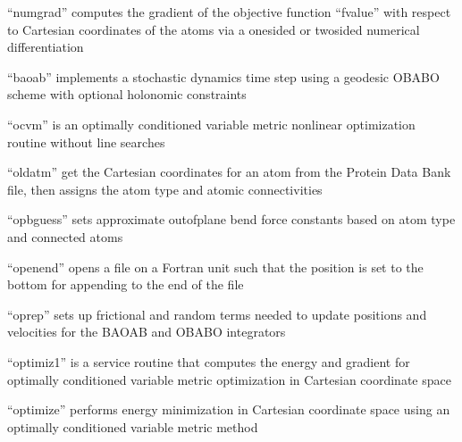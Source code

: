 \documentclass[letterpaper,11pt,english]{sphinxmanual}
\begin{document}
\sphinxAtStartPar
{}

\sphinxAtStartPar
“numgrad” computes the gradient of the objective function “fvalue” with respect to Cartesian coordinates of the atoms via a one\sphinxhyphen{}sided or two\sphinxhyphen{}sided numerical differentiation

\sphinxAtStartPar
{}

\sphinxAtStartPar
“baoab” implements a stochastic dynamics time step using a geodesic OBABO scheme with optional holonomic constraints

\sphinxAtStartPar
{}

\sphinxAtStartPar
“ocvm” is an optimally conditioned variable metric nonlinear optimization routine without line searches

\sphinxAtStartPar
{}

\sphinxAtStartPar
“oldatm” get the Cartesian coordinates for an atom from the Protein Data Bank file, then assigns the atom type and atomic connectivities

\sphinxAtStartPar
{}

\sphinxAtStartPar
“opbguess” sets approximate out\sphinxhyphen{}of\sphinxhyphen{}plane bend force constants based on atom type and connected atoms

\sphinxAtStartPar
{}

\sphinxAtStartPar
“openend” opens a file on a Fortran unit such that the position is set to the bottom for appending to the end of the file

\sphinxAtStartPar
{}

\sphinxAtStartPar
“oprep” sets up frictional and random terms needed to update positions and velocities for the BAOAB and OBABO integrators

\sphinxAtStartPar
{}

\sphinxAtStartPar
{}

\sphinxAtStartPar
“optimiz1” is a service routine that computes the energy and gradient for optimally conditioned variable metric optimization in Cartesian coordinate space

\sphinxAtStartPar
{}

\sphinxAtStartPar
“optimize” performs energy minimization in Cartesian coordinate space using an optimally conditioned variable metric method
\end{document}
